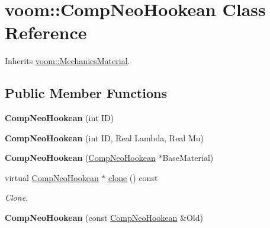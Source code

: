 \hypertarget{classvoom_1_1_comp_neo_hookean}{
\section{voom::CompNeoHookean Class Reference}
\label{classvoom_1_1_comp_neo_hookean}
}


Inherits \hyperlink{classvoom_1_1_mechanics_material}{voom::MechanicsMaterial}.\subsection*{Public Member Functions}
\begin{DoxyCompactItemize}
\item 
\hypertarget{classvoom_1_1_comp_neo_hookean_af45804d1363292b21b84fbdef5351fcc}{
{\bfseries CompNeoHookean} (int ID)}
\label{classvoom_1_1_comp_neo_hookean_af45804d1363292b21b84fbdef5351fcc}

\item 
\hypertarget{classvoom_1_1_comp_neo_hookean_a548ad35106953dbc9ad92c6f93329fd8}{
{\bfseries CompNeoHookean} (int ID, Real Lambda, Real Mu)}
\label{classvoom_1_1_comp_neo_hookean_a548ad35106953dbc9ad92c6f93329fd8}

\item 
\hypertarget{classvoom_1_1_comp_neo_hookean_ae5c5db6a88211dc9b339180e9218498f}{
{\bfseries CompNeoHookean} (\hyperlink{classvoom_1_1_comp_neo_hookean}{CompNeoHookean} $\ast$BaseMaterial)}
\label{classvoom_1_1_comp_neo_hookean_ae5c5db6a88211dc9b339180e9218498f}

\item 
\hypertarget{classvoom_1_1_comp_neo_hookean_ae3cd920136835f8f849a0b2f1198b215}{
virtual \hyperlink{classvoom_1_1_comp_neo_hookean}{CompNeoHookean} $\ast$ \hyperlink{classvoom_1_1_comp_neo_hookean_ae3cd920136835f8f849a0b2f1198b215}{clone} () const }
\label{classvoom_1_1_comp_neo_hookean_ae3cd920136835f8f849a0b2f1198b215}

\begin{DoxyCompactList}\small\item\em Clone. \item\end{DoxyCompactList}\item 
\hypertarget{classvoom_1_1_comp_neo_hookean_abe180b316d5fc6dfca70101295e88391}{
{\bfseries CompNeoHookean} (const \hyperlink{classvoom_1_1_comp_neo_hookean}{CompNeoHookean} \&Old)}
\label{classvoom_1_1_comp_neo_hookean_abe180b316d5fc6dfca70101295e88391}


\end{DoxyCompactItemize}
